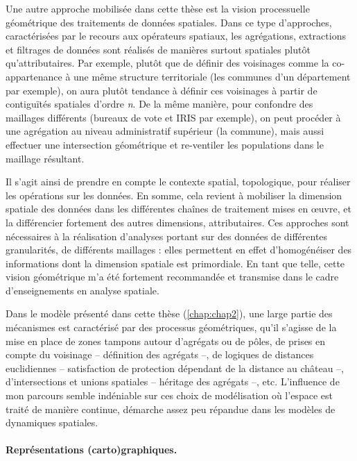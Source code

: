 Une autre approche mobilisée dans cette thèse est la vision processuelle \og géométrique\fg{} des traitements de données spatiales.
Dans ce type d'approches, caractérisées par le recours aux opérateurs spatiaux, les agrégations, extractions et filtrages de données sont réalisés de manières surtout spatiales plutôt qu'attributaires.
Par exemple, plutôt que de définir des voisinages comme la co-appartenance à une même structure territoriale (les communes d'un département par exemple), on aura plutôt tendance à définir ces voisinages à partir de contiguïtés spatiales d'ordre \textit{n}.
De la même manière, pour confondre des maillages différents (bureaux de vote et IRIS par exemple), on peut procéder à une agrégation au niveau administratif supérieur (la commune), mais aussi effectuer une intersection géométrique et re-ventiler les populations dans le maillage résultant.

Il s'agit ainsi de prendre en compte le contexte spatial, topologique, pour réaliser les opérations sur les données.
En somme, cela revient à mobiliser la dimension spatiale des données dans les différentes chaînes de traitement mises en œuvre, et la différencier fortement des autres dimensions, attributaires.
Ces approches sont nécessaires à la réalisation d'analyses portant sur des données de différentes granularités, de différents maillages : elles permettent en effet d'homogénéiser des informations dont la dimension spatiale est primordiale.
En tant que telle, cette vision \og géométrique\fg{} m'a été fortement recommandée et transmise dans le cadre d'enseignements en analyse spatiale.

Dans le modèle présenté dans cette thèse (\cref{chap:chap2}), une large partie des mécanismes est caractérisé par des processus géométriques, qu'il s'agisse de la mise en place de zones tampons autour d'agrégats ou de pôles, de prises en compte du voisinage -- définition des agrégats --, de logiques de distances euclidiennes -- satisfaction de protection dépendant de la distance au château --, d'intersections et unions spatiales -- héritage des agrégats --, etc.
L'influence de mon parcours semble indéniable sur ces choix de modélisation où l'espace est traité de manière continue, démarche assez peu répandue dans les modèles de dynamiques spatiales.

\paragraph{Représentations (carto)graphiques.}

